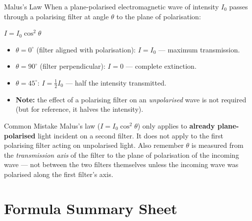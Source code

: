 \begin{formulabox}{Malus's Law}
When a plane-polarised electromagnetic wave of intensity $I_0$ passes through a polarising filter at angle $\theta$ to the plane of polarisation:
\begin{center}
\Large $I = I_0 \cos^2\theta$
\end{center}
\begin{itemize}[itemsep=2pt]
  \item $\theta = 0^\circ$ (filter aligned with polarisation): $I = I_0$ — maximum transmission.
  \item $\theta = 90^\circ$ (filter perpendicular): $I = 0$ — complete extinction.
  \item $\theta = 45^\circ$: $I = \tfrac{1}{2}I_0$ — half the intensity transmitted.
  \item \textbf{Note:} the effect of a polarising filter on an \emph{unpolarised} wave is not required (but for reference, it halves the intensity).
\end{itemize}
\end{formulabox}

\begin{warningbox}{Common Mistake}
Malus's law ($I = I_0\cos^2\theta$) only applies to \textbf{already plane-polarised} light incident on a second filter. It does not apply to the first polarising filter acting on unpolarised light. Also remember $\theta$ is measured from the \emph{transmission axis} of the filter to the plane of polarisation of the incoming wave — not between the two filters themselves unless the incoming wave was polarised along the first filter's axis.
\end{warningbox}

\section{Formula Summary Sheet}

